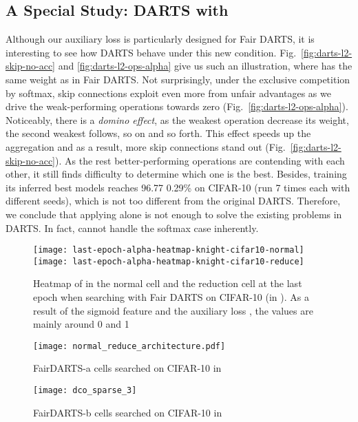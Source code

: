 \documentclass[runningheads]{llncs}
\begin{document}
\subsection{A Special Study: DARTS with  }

Although our auxiliary loss  is particularly designed for Fair DARTS, it is interesting to see how DARTS behave under this new condition. Fig.~\ref{fig:darts-l2-skip-no-acc} and \ref{fig:darts-l2-ops-alpha} give us such an illustration, where  has the same weight  as in Fair DARTS. Not surprisingly, under the exclusive competition by softmax, skip connections exploit even more from unfair advantages as we drive the weak-performing operations towards zero (Fig.~\ref{fig:darts-l2-ops-alpha}). Noticeably,  there is a \emph{domino effect}, as the weakest operation decrease its weight, the second weakest follows, so on and so forth. This effect speeds up the aggregation and as a result, more skip connections stand out (Fig.~\ref{fig:darts-l2-skip-no-acc}). As the rest better-performing operations are contending with each other, it still finds difficulty to determine which one is the best. 
Besides, training its inferred best models reaches 96.77  0.29\% on CIFAR-10  (run 7 times each with different seeds), which is not too different from the original DARTS. Therefore, we conclude that  applying  alone is not enough to solve the existing problems in DARTS. In fact,  cannot handle the softmax case inherently. 


\begin{figure}[ht]
	\centering
	\texttt{[image: last-epoch-alpha-heatmap-knight-cifar10-normal]}
	\texttt{[image: last-epoch-alpha-heatmap-knight-cifar10-reduce]}
\caption{Heatmap of  in the normal cell and the reduction cell at the last epoch when searching with Fair DARTS on CIFAR-10 (in ). As a result of the sigmoid feature and the auxiliary loss , the values are mainly around 0 and 1}
	\label{fig:sigmoid-fair-darts-cifar}
\end{figure}

\begin{figure}[ht]
	\centering
	\texttt{[image: normal\_reduce\_architecture.pdf]}
\caption{FairDARTS-a cells searched on CIFAR-10 in }
	\label{fig:normal-reduce-architecture}
\end{figure}

\begin{figure}[ht]
	\centering
	\texttt{[image: dco\_sparse\_3]}
\caption{FairDARTS-b cells searched on CIFAR-10 in }
	\label{fig:fairdarts-b-normal-reduce-architecture}
\end{figure}
\end{document}
